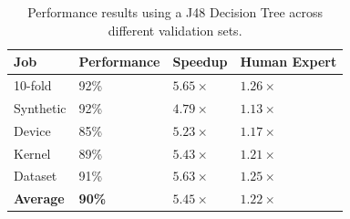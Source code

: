 \documentclass[nonatbib,preprint,9pt]{sigplanconf}
\begin{document}
\begin{table}
\scriptsize
\centering
\begin{tabular}{llll}
\toprule
              Job &    Performance &            Speedup &       Human Expert \\
\midrule
          10-fold &           92\% &       $5.65\times$ &       $1.26\times$ \\
        Synthetic &           92\% &       $4.79\times$ &       $1.13\times$ \\
           Device &           85\% &       $5.23\times$ &       $1.17\times$ \\
           Kernel &           89\% &       $5.43\times$ &       $1.21\times$ \\
          Dataset &           91\% &       $5.63\times$ &       $1.25\times$ \\
 \textbf{Average} &  \textbf{90\%} &  $\bm{5.45\times}$ &  $\bm{1.22\times}$ \\
\bottomrule
\end{tabular}
\caption{Performance results using
  a J48 Decision Tree across different validation sets.}
\label{tab:class}
\end{table}


\end{document}

